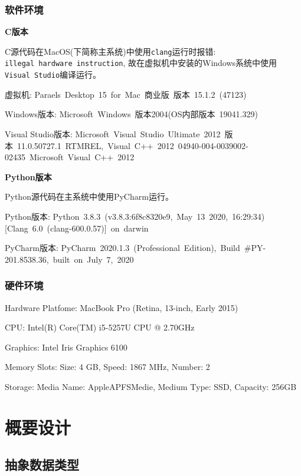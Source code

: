 \documentclass[a4paper]{ctexart}
\begin{document}
\subsubsection{软件环境}\label{header-n52}

\textbf{C版本}

C源代码在MacOS(下简称主系统)中使用\texttt{clang}运行时报错: \texttt{illegal\ hardware\ instruction}, 故在虚拟机中安装的Windows系统中使用\texttt{Visual\ Studio}编译运行。

虚拟机: Paraels\ Desktop\ 15\ for\ Mac\ 商业版\ 版本\ 15.1.2\ (47123)

Windows版本: Microsoft\ Windows\ 版本2004(OS内部版本\ 19041.329)

Visual Studio版本: Microsoft\ Visual\ Studio\ Ultimate\ 2012\ 版本\ 11.0.50727.1\ RTMREL,\ Visual\ C++\ 2012\ 04940-004-0039002-02435\ Microsoft\ Visual\ C++\ 2012

\textbf{Python版本}

Python源代码在主系统中使用PyCharm运行。

Python版本: Python\ 3.8.3\ (v3.8.3:6f8c8320e9,\ May\ 13\ 2020,\ 16:29:34){[}Clang\ 6.0\ (clang-600.0.57){]}\ on\ darwin

PyCharm版本: PyCharm\ 2020.1.3\ (Professional\ Edition),\ Build\ \#PY-201.8538.36,\ built\ on\ July\ 7,\ 2020

\subsubsection{硬件环境}\label{header-n62}

Hardware Platfome: MacBook Pro (Retina, 13-inch, Early 2015)

CPU: Intel(R) Core(TM) i5-5257U CPU @ 2.70GHz

Graphics: Intel Iris Graphics 6100

Memory Slots: Size: 4 GB, Speed: 1867 MHz, Number: 2

Storage: Media Name: AppleAPFSMedie, Medium Type: SSD, Capacity: 256GB


\section{概要设计}\label{header-n68}

\subsection{抽象数据类型}\label{header-n69}
\end{document}
